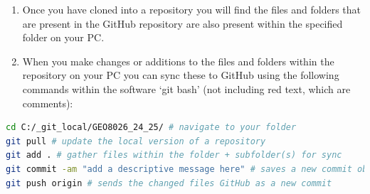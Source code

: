 \documentclass[11pt,onecolumn,a4paper,notitlepage]{article}
\begin{document}
\begin{enumerate}
\item{Once you have cloned into a repository you will find the files and folders that are present in the GitHub repository are also present within the specified folder on your PC.}

\item{When you make changes or additions to the files and folders within the repository on your PC you can sync these to GitHub using the following commands within the software `git bash' (not including red text, which are comments):}

\end{enumerate}

\begin{lstlisting}[language=bash]
cd C:/_git_local/GEO8026_24_25/ # navigate to your folder
git pull # update the local version of a repository
git add . # gather files within the folder + subfolder(s) for sync
git commit -am "add a descriptive message here" # saves a new commit object 
git push origin # sends the changed files GitHub as a new commit
\end{lstlisting}
\end{document}
